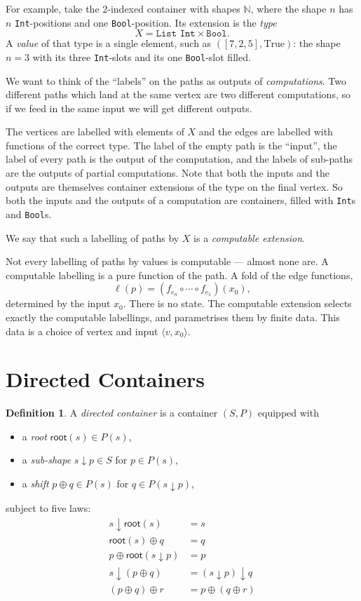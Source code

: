 \documentclass[11pt, a4paper]{article}
\theoremstyle{definition}
\newtheorem{definition}{Definition}[section]
\theoremstyle{plain}
\newcommand{\droot}{\mathsf{root}}
\newcommand{\dsub}{\mathbin{\downarrow}}
\newcommand{\dshift}{\mathbin{\oplus}}
\begin{document}
For example, take the $2$-indexed container with shapes $\mathbb{N}$,
where the shape $n$ has $n$ \texttt{Int}-positions and one
\texttt{Bool}-position.  Its extension is the \emph{type}
\[
  X = \texttt{List Int} \times \texttt{Bool}.
\]
A \emph{value} of that type is a single element, such as
$([7, 2, 5], \mathrm{True})$: the shape $n = 3$ with its three
\texttt{Int}-slots and its one \texttt{Bool}-slot filled.

We want to think of the ``labels'' on the paths as outputs of
\emph{computations}.  Two different paths which land at the same
vertex are two different computations, so if we feed in the same
input we will get different outputs.

The vertices are labelled with elements of $X$ and the edges are
labelled with functions of the correct type.  The label of the empty
path is the ``input'', the label of every path is the output of the
computation, and the labels of sub-paths are the outputs of partial
computations.  Note that both the inputs and the outputs are
themselves container extensions of the type on the final vertex.  So
both the inputs and the outputs of a computation are containers,
filled with \texttt{Int}s and \texttt{Bool}s.

We say that such a labelling of paths by $X$ is a \emph{computable
extension}.

Not every labelling of paths by values is computable --- almost none
are.  A computable labelling is a pure function of the path.  A fold
of the edge functions,
\[
  \ell(p) = (f_{e_n} \circ \cdots \circ f_{e_1})(x_0),
\]
determined by the input $x_0$.  There is no state.  The computable
extension selects exactly the computable labellings, and parametrises
them by finite data.  This data is a choice of vertex and input $\langle v, x_0
\rangle$.

\section{Directed Containers}

\begin{definition}
A \emph{directed container} is a container $(S, P)$ equipped with
\begin{itemize}
  \item a \emph{root} $\droot(s) \in P(s)$,
  \item a \emph{sub-shape} $s \dsub p \in S$ for $p \in P(s)$,
  \item a \emph{shift} $p \dshift q \in P(s)$ for $q \in P(s \dsub p)$,
\end{itemize}
subject to five laws:
\begin{align}
  s \dsub \droot(s) &= s \tag{D1}\\
  \droot(s) \dshift q &= q \tag{D2}\\
  p \dshift \droot(s \dsub p) &= p \tag{D3}\\
  s \dsub (p \dshift q) &= (s \dsub p) \dsub q \tag{D4}\\
  (p \dshift q) \dshift r &= p \dshift (q \dshift r) \tag{D5}
\end{align}
\end{definition}
\end{document}
